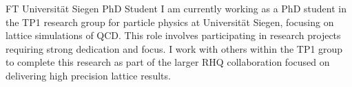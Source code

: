 \documentclass[10pt]{article} %
\begin{document}
\begin{paracol}{2}
{FT}
{Universit\"{a}t Siegen}
{PhD Student}
{I am currently working as a PhD student in the TP1 research group for particle physics at Universit\"{a}t Siegen, focusing on lattice simulations of QCD. This role involves participating in research projects requiring strong dedication and focus. I work with others within the TP1 group to complete this research as part of the larger RHQ collaboration focused on delivering high precision lattice results.}
%
%
%
%





\end{paracol}
\end{document}
